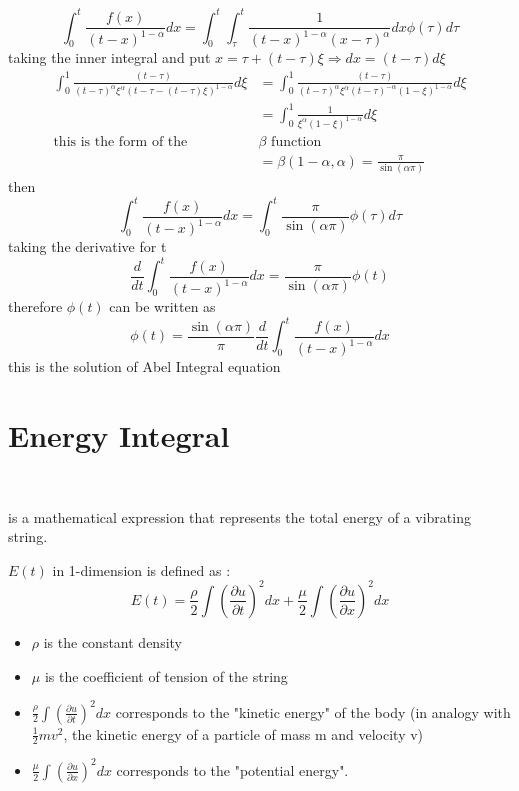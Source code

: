 \documentclass[]{article}
\begin{document}
\[
\int_{0}^{t} \frac{f(x)}{{(t-x)}^{1-\alpha}} dx= \int_{0}^{t}\int_{\tau}^{t} \frac{1}{{(t-x)}^{1-\alpha}{(x-\tau)}^\alpha} dx \phi(\tau) d\tau
\]
taking the inner integral and put $x = \tau + (t-\tau)\xi \Longrightarrow dx = (t-\tau)d\xi$
\begin{align*}
    \int_{0}^{1} \frac{(t-\tau)}{{(t-\tau)}^\alpha \xi^\alpha {(t-\tau-(t-\tau)\xi)}^{1-\alpha}} d\xi 
    &= \int_{0}^{1} \frac{(t-\tau)}{{(t-\tau)}^\alpha \xi^\alpha {(t-\tau)}^{-\alpha}{(1-\xi)}^{1-\alpha}} d\xi
    \\
    &= \int_{0}^{1} \frac{1}{\xi^{\alpha} {(1-\xi)}^{1-\alpha} } d\xi
    \\
    \text{this is the form of the } &\beta \text{ function }    
    \\
    &=\beta (1-\alpha,\alpha) = \frac{\pi}{\sin(\alpha\pi)}
\end{align*}
then
\[
\int_{0}^{t} \frac{f(x)}{{(t-x)}^{1-\alpha}} dx = \int_{0}^{t} \frac{\pi}{\sin(\alpha\pi)} \phi(\tau) d\tau
\]
taking the derivative for t 
\[
\frac{d}{dt} \int_{0}^{t} \frac{f(x)}{{(t-x)}^{1-\alpha}} dx = \frac{\pi}{\sin(\alpha\pi)} \phi(t)
\]
therefore $\phi(t)$ can be written as 
\[
\phi(t) = \frac{\sin(\alpha\pi)}{\pi}  \frac{d}{dt} \int_{0}^{t} \frac{f(x)}{{(t-x)}^{1-\alpha}} dx
\]
this is the solution of Abel Integral equation

\newpage

\section{Energy Integral}
\
\begin{definition} 
    is a mathematical expression that represents the total energy of a vibrating string.
\end{definition}
$E(t)$ in 1-dimension is defined as :
\[
E(t)  =  \frac{\rho}{2} \int {\left(\frac{\partial u}{\partial t}\right)}^2 dx + \frac{\mu}{2} \int {\left(\frac{\partial u}{\partial x}\right)}^2 dx
\] 
\begin{itemize}
    \item $\rho$ is the constant density
    \item $\mu$ is the coefficient of tension of the string
    \item $\displaystyle \frac{\rho}{2} \int {\left(\frac{\partial u}{\partial t}\right)}^2 dx $ corresponds to the "kinetic energy" of the body (in analogy with $\frac{1}{2}mv^2$, the kinetic energy of a particle of mass m and velocity v)
    \item $\displaystyle \frac{\mu}{2} \int {\left(\frac{\partial u}{\partial x}\right)}^2 dx $ corresponds to the "potential energy".
\end{itemize}
\end{document}

